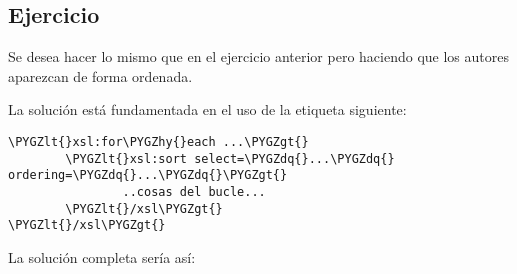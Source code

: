 \documentclass[letterpaper,10pt,spanish]{sphinxmanual}
\def\PYGZlt{\char`\<}
\def\PYGZgt{\char`\>}
\def\PYGZhy{\char`\-}
\def\PYGZdq{\char`\"}
\begin{document}
\subsection{Ejercicio}
\label{tema7:id6}
Se desea hacer lo mismo que en el ejercicio anterior pero haciendo que los autores aparezcan de forma ordenada.

La solución está fundamentada en el uso de la etiqueta siguiente:

\begin{Verbatim}[commandchars=\\\{\}]
\PYGZlt{}xsl:for\PYGZhy{}each ...\PYGZgt{}
        \PYGZlt{}xsl:sort select=\PYGZdq{}...\PYGZdq{} ordering=\PYGZdq{}...\PYGZdq{}\PYGZgt{}
                ..cosas del bucle...
        \PYGZlt{}/xsl\PYGZgt{}
\PYGZlt{}/xsl\PYGZgt{}
\end{Verbatim}

La solución completa sería así:
\end{document}
